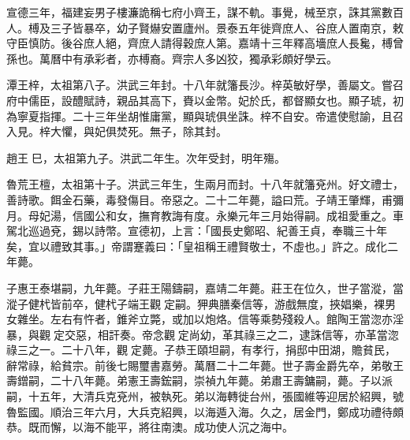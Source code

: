 宣德三年，福建妄男子樓濂詭稱七府小齊王，謀不軌。事覺，械至京，誅其黨數百人。榑及三子皆暴卒，幼子賢爀安置廬州。景泰五年徙齊庶人、谷庶人置南京，敕守臣慎防。後谷庶人絕，齊庶人請得穀庶人第。嘉靖十三年釋高墻庶人長毚，榑曾孫也。萬曆中有承彩者，亦榑裔。齊宗人多凶狡，獨承彩頗好學云。

潭王梓，太祖第八子。洪武三年封。十八年就籓長沙。梓英敏好學，善屬文。嘗召府中儒臣，設醴賦詩，親品其高下，賚以金幣。妃於氏，都督顯女也。顯子琥，初為寧夏指揮。二十三年坐胡惟庸黨，顯與琥俱坐誅。梓不自安。帝遣使慰諭，且召入見。梓大懼，與妃俱焚死。無子，除其封。

趙王巳，太祖第九子。洪武二年生。次年受封，明年殤。

魯荒王檀，太祖第十子。洪武三年生，生兩月而封。十八年就籓兗州。好文禮士，善詩歌。餌金石藥，毒發傷目。帝惡之。二十二年薨，謚曰荒。子靖王肇輝，甫彌月。母妃湯，信國公和女，撫育教誨有度。永樂元年三月始得嗣。成祖愛重之。車駕北巡過兗，錫以詩幣。宣德初，上言：「國長史鄭昭、紀善王貞，奉職三十年矣，宜以禮致其事。」帝謂蹇義曰：「皇祖稱王禮賢敬士，不虛也。」許之。成化二年薨。

子惠王泰堪嗣，九年薨。子莊王陽鑄嗣，嘉靖二年薨。莊王在位久，世子當漎，當漎子健杙皆前卒，健杙子端王觀定嗣。狎典膳秦信等，游戲無度，挾娼樂，裸男女雜坐。左右有忤者，錐斧立斃，或加以炮烙。信等乘勢殘殺人。館陶王當淴亦淫暴，與觀定交惡，相訐奏。帝念觀定尚幼，革其祿三之二，逮誅信等，亦革當淴祿三之一。二十八年，觀定薨。子恭王頤坦嗣，有孝行，捐邸中田湖，贍貧民，辭常祿，給貧宗。前後七賜璽書嘉勞。萬曆二十二年薨。世子壽金爵先卒，弟敬王壽鏳嗣，二十八年薨。弟憲王壽鋐嗣，崇禎九年薨。弟肅王壽鏞嗣，薨。子以派嗣，十五年，大清兵克兗州，被執死。弟以海轉徙台州，張國維等迎居於紹興，號魯監國。順治三年六月，大兵克紹興，以海遁入海。久之，居金門，鄭成功禮待頗恭。既而懈，以海不能平，將往南澳。成功使人沉之海中。

